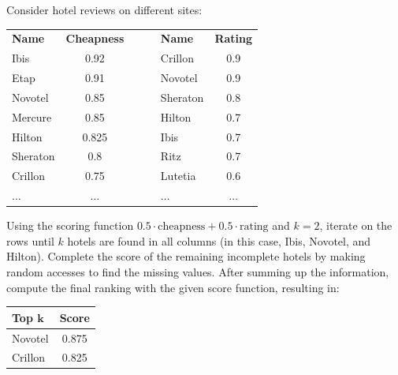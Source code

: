 \begin{example}
    Consider hotel reviews on different sites:
    \begin{table}[H]
        \centering
        \begin{tabular}{|lc|c|lc|}
        \cline{1-2} \cline{4-5}
        \textbf{Name} & \textbf{Cheapness} & $\:\:\:\:\:\:$ & \textbf{Name} & \textbf{Rating} \\ \cline{1-2} \cline{4-5} 
        Ibis          & 0.92               &                & Crillon       & 0.9             \\ 
        Etap          & 0.91               &                & Novotel       & 0.9             \\  
        Novotel       & 0.85               &                & Sheraton      & 0.8             \\  
        Mercure       & 0.85               &                & Hilton        & 0.7             \\  
        Hilton        & 0.825              &                & Ibis          & 0.7             \\  
        Sheraton      & 0.8                &                & Ritz          & 0.7             \\  
        Crillon       & 0.75               &                & Lutetia       & 0.6             \\  
        $\dots$       & $\dots$            &                & $\dots$       & $\dots$         \\ \cline{1-2} \cline{4-5} 
        \end{tabular}
    \end{table}
    Using the scoring function $0.5 \cdot \text{cheapness} + 0.5 \cdot \text{rating}$ and $k=2$, iterate on the rows until $k$ hotels are found in all columns (in this case, Ibis, Novotel, and Hilton). 
    Complete the score of the remaining incomplete hotels by making random accesses to find the missing values. 
    After summing up the information, compute the final ranking with the given score function, resulting in:
    \begin{table}[H]
        \centering
        \begin{tabular}{|lc|}
        \hline
        \textbf{Top $\boldsymbol{k}$} & \textbf{Score} \\ \hline
        Novotel                       & 0.875          \\ 
        Crillon                       & 0.825          \\ \hline
        \end{tabular}
    \end{table}
\end{example}

